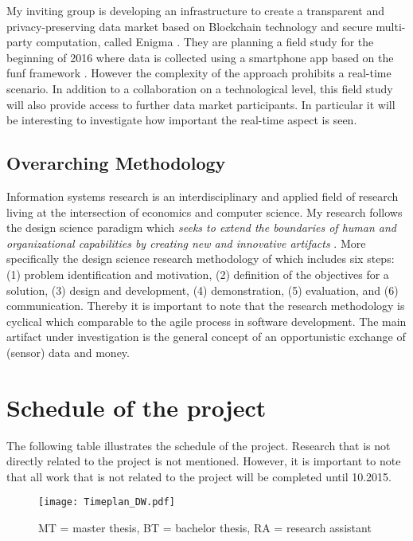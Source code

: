 \documentclass[a4paper, 12pt]{scrartcl}
\begin{document}
My inviting group is developing an infrastructure to create a transparent and privacy-preserving data market based on Blockchain technology and secure multi-party computation, called Enigma \parencite{zyskind2015enigma, zyskind2015decentralizing}. They are planning a field study for the beginning of 2016 where data is collected using a smartphone app based on the funf framework \parencite{Aharony:2011:SFI:2072697.2073099}. However the complexity of the approach prohibits a real-time scenario. In addition to a  collaboration on a technological level, this field study will also provide access to further data market participants. In particular it will be interesting to investigate how important the real-time aspect is seen.


\subsection{Overarching Methodology}
Information systems research is an interdisciplinary and applied field of research living at the intersection of economics and computer science. My research follows the design science paradigm which \textit{seeks to extend the boundaries of human and organizational capabilities by creating new and innovative artifacts} \parencite{Hevner:2004:DSI:2017212.2017217}. More specifically the design science research methodology of \cite{Peffers:2007:DSR:1481765.1481768} which includes six steps: (1) problem identification and motivation, (2) definition of the objectives for a solution, (3) design and development, (4) demonstration, (5) evaluation, and (6) communication. Thereby it is important to note that the research methodology is cyclical which comparable to the agile process in software development. The main artifact under investigation is the general concept of an opportunistic exchange of (sensor) data and money. 

%
%

\printbibliography[notkeyword=planned]

\clearpage

\section{Schedule of the project}

The following table illustrates the schedule of the project. Research that is not directly related to the project is not mentioned. However, it is important to note that all work that is not related to the project will be completed until 10.2015.
\begin{figure}[H]
\centerline{\texttt{[image: Timeplan\_DW.pdf]}}
\caption{MT = master thesis, BT = bachelor thesis, RA = research assistant}
\end{figure}
\end{document}
